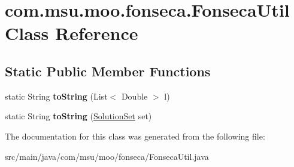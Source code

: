\hypertarget{classcom_1_1msu_1_1moo_1_1fonseca_1_1FonsecaUtil}{\section{com.\-msu.\-moo.\-fonseca.\-Fonseca\-Util Class Reference}
\label{classcom_1_1msu_1_1moo_1_1fonseca_1_1FonsecaUtil}
}
\subsection*{Static Public Member Functions}
\begin{DoxyCompactItemize}
\item 
\hypertarget{classcom_1_1msu_1_1moo_1_1fonseca_1_1FonsecaUtil_a4b8bdc4e76542bde4bfeba4a6fbbab63}{static String {\bfseries to\-String} (List$<$ Double $>$ l)}\label{classcom_1_1msu_1_1moo_1_1fonseca_1_1FonsecaUtil_a4b8bdc4e76542bde4bfeba4a6fbbab63}

\item 
\hypertarget{classcom_1_1msu_1_1moo_1_1fonseca_1_1FonsecaUtil_a7325063e612b58977b75f1d2a37cc5bb}{static String {\bfseries to\-String} (\hyperlink{classcom_1_1msu_1_1moo_1_1model_1_1solution_1_1SolutionSet}{Solution\-Set} set)}\label{classcom_1_1msu_1_1moo_1_1fonseca_1_1FonsecaUtil_a7325063e612b58977b75f1d2a37cc5bb}

\end{DoxyCompactItemize}


The documentation for this class was generated from the following file\-:\begin{DoxyCompactItemize}
\item 
src/main/java/com/msu/moo/fonseca/Fonseca\-Util.\-java\end{DoxyCompactItemize}
